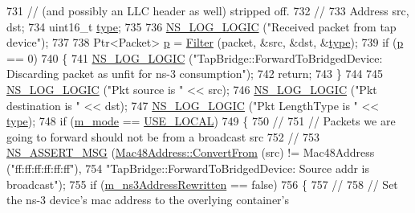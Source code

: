 \begin{DoxyCode}
731   \textcolor{comment}{// (and possibly an LLC header as well) stripped off.}
732   \textcolor{comment}{//}
733   Address src, dst;
734   uint16\_t \hyperlink{visualizer-ideas_8txt_add98db9e15e2a58cf2b57623e7aa893a}{type};
735 
736   \hyperlink{group__logging_ga88acd260151caf2db9c0fc84997f45ce}{NS\_LOG\_LOGIC} (\textcolor{stringliteral}{"Received packet from tap device"});
737 
738   Ptr<Packet> \hyperlink{lte__link__budget_8m_ac9de518908a968428863f829398a4e62}{p} = \hyperlink{classns3_1_1TapBridge_aa141455ff96593217dcffd47d7bc48d0}{Filter} (packet, &src, &dst, &\hyperlink{visualizer-ideas_8txt_add98db9e15e2a58cf2b57623e7aa893a}{type});
739   \textcolor{keywordflow}{if} (\hyperlink{lte__link__budget_8m_ac9de518908a968428863f829398a4e62}{p} == 0)
740     \{
741       \hyperlink{group__logging_ga88acd260151caf2db9c0fc84997f45ce}{NS\_LOG\_LOGIC} (\textcolor{stringliteral}{"TapBridge::ForwardToBridgedDevice:  Discarding packet as unfit for ns-3
       consumption"});
742       \textcolor{keywordflow}{return};
743     \}
744 
745   \hyperlink{group__logging_ga88acd260151caf2db9c0fc84997f45ce}{NS\_LOG\_LOGIC} (\textcolor{stringliteral}{"Pkt source is "} << src);
746   \hyperlink{group__logging_ga88acd260151caf2db9c0fc84997f45ce}{NS\_LOG\_LOGIC} (\textcolor{stringliteral}{"Pkt destination is "} << dst);
747   \hyperlink{group__logging_ga88acd260151caf2db9c0fc84997f45ce}{NS\_LOG\_LOGIC} (\textcolor{stringliteral}{"Pkt LengthType is "} << \hyperlink{visualizer-ideas_8txt_add98db9e15e2a58cf2b57623e7aa893a}{type});
748   \textcolor{keywordflow}{if} (\hyperlink{classns3_1_1TapBridge_aaae30bc9d5dd36e3a4d569cf9bcf40eb}{m\_mode} == \hyperlink{classns3_1_1TapBridge_acac8d3ebe259ddfa9cd369515f04618daa73ff9ba9e1659aeda35d7181b601c75}{USE\_LOCAL})
749     \{
750       \textcolor{comment}{//}
751       \textcolor{comment}{// Packets we are going to forward should not be from a broadcast src}
752       \textcolor{comment}{//}
753       \hyperlink{assert_8h_aff5ece9066c74e681e74999856f08539}{NS\_ASSERT\_MSG} (\hyperlink{classns3_1_1Mac48Address_a911ce13603a9ef837545a032b6523ae4}{Mac48Address::ConvertFrom} (src) != Mac48Address 
      (\textcolor{stringliteral}{"ff:ff:ff:ff:ff:ff"}), 
754                      \textcolor{stringliteral}{"TapBridge::ForwardToBridgedDevice:  Source addr is broadcast"});
755       \textcolor{keywordflow}{if} (\hyperlink{classns3_1_1TapBridge_a3200dc6b4b46d2f0fb13c867fcb0d118}{m\_ns3AddressRewritten} == \textcolor{keyword}{false})
756         \{
757           \textcolor{comment}{//}
758           \textcolor{comment}{// Set the ns-3 device's mac address to the overlying container's}

\end{DoxyCode}
